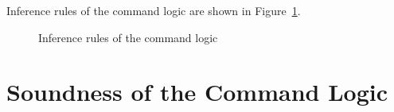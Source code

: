 \documentclass[11pt]{report}
\begin{document}
Inference rules of the command logic are shown in Figure~\ref{fig:command-logic-inference-rules}. 

\begin{figure}[h]
	\centering
	
	
	\vspace{1em}
	

	\vspace{1em}
	
	
	\vspace{1em}
	
	
	\vspace{1em}
	
	
	\vspace{1em}

	
	\vspace{1em}


	\vspace{1em}

	
	\vspace{1em}
	

	\caption{Inference rules of the command logic}
	\label{fig:command-logic-inference-rules}
\end{figure}


\section{Soundness of the Command Logic} %
\label{sec:soundness}
\end{document}
